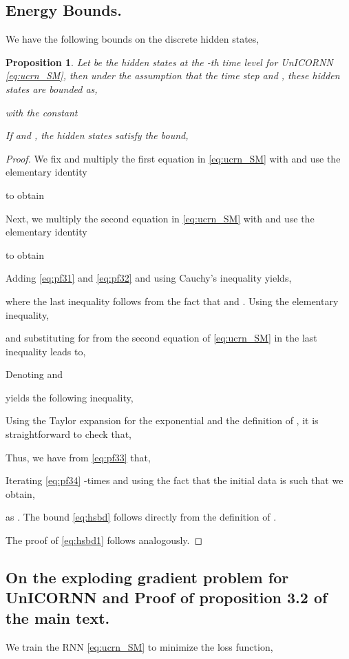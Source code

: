 \documentclass[a4paper]{article}
\newtheorem{proposition}[theorem]{Proposition}
\begin{document}
\subsection{Energy Bounds.}
We have the following bounds on the discrete hidden states, 
\begin{proposition}
\label{prop:31}
Let  be the hidden states at the -th time level  for UnICORNN \eqref{eq:ucrn_SM}, then under the assumption that the time step  and , these hidden states are bounded as,

with the constant 

If  and , the hidden states satisfy the bound,

\end{proposition}
\begin{proof}
We fix  and multiply the first equation in \eqref{eq:ucrn_SM} with  and use the elementary identity 

to obtain

Next, we multiply the second equation in \eqref{eq:ucrn_SM} with  and use the elementary identity 

to obtain

Adding \eqref{eq:pf31} and \eqref{eq:pf32} and using Cauchy's inequality yields,

where the last inequality follows from the fact that  and .
Using the elementary inequality,

and substituting for  from the second equation of \eqref{eq:ucrn_SM} in the last inequality leads to,

Denoting  and 

yields the following inequality,

Using the Taylor expansion for the exponential and the definition of , it is straightforward to check that,

Thus, we have from \eqref{eq:pf33} that,

Iterating \eqref{eq:pf34} -times and using the fact that the initial data is such that  we obtain,

as . The bound \eqref{eq:hsbd} follows directly from the definition of .


The proof of \eqref{eq:hsbd1} follows analogously. 
\end{proof}
\subsection{On the exploding gradient problem for UnICORNN and Proof of proposition 3.2 of the main text.}
We train the RNN \eqref{eq:ucrn_SM} to minimize the loss function,
\end{document}
